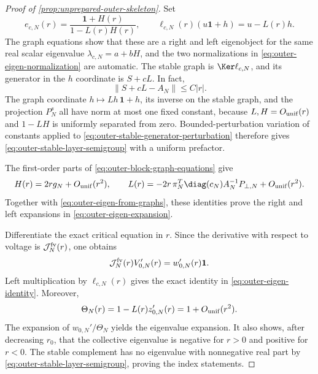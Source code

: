 \begin{proof}[Proof of \cref{prop:unprepared-outer-skeleton}]
Set
\begin{equation}
 e_{c,N}(r)=\frac{\mathbf1+H(r)}{1-L(r)H(r)},
 \qquad
 \ell_{c,N}(r)(u\mathbf1+h)=u-L(r)h.                \label{eq:outer-eigen-from-graphs}
\end{equation}
The graph equations show that these are a right and left eigenobject for the
same real scalar eigenvalue \(\lambda_{c,N}=a+bH\), and the two
normalizations in \cref{eq:outer-eigen-normalization} are automatic.  The
stable graph is \(\Ker\ell_{c,N}\), and its generator in the \(h\)
coordinate is \(S+cL\).  In fact,
\begin{equation}
 \|S+cL-A_N\|\le C|r|.                               \label{eq:outer-stable-generator-perturbation}
\end{equation}
The graph coordinate \(h\mapsto Lh\,\mathbf1+h\), its inverse on the stable
graph, and the projection \(P_N^s\) all have norm at most one fixed constant,
because \(L,H=O_{\rm unif}(r)\) and \(1-LH\) is uniformly separated from zero.
Bounded-perturbation variation of constants applied to
\cref{eq:outer-stable-generator-perturbation} therefore gives
\cref{eq:outer-stable-layer-semigroup} with a uniform prefactor.

The first-order parts of \cref{eq:outer-block-graph-equations} give
\begin{equation}
 H(r)=2r g_N+O_{\rm unif}(r^2),
 \qquad
 L(r)=-2r\,\pi_N^T\diag(c_N)A_N^{-1}P_{\perp,N}
          +O_{\rm unif}(r^2).                        \label{eq:outer-HL-expansion}
\end{equation}
Together with \cref{eq:outer-eigen-from-graphs}, these identities prove the
right and left expansions in \cref{eq:outer-eigen-expansion}.

Differentiate the exact critical equation in \(r\).  Since the derivative
with respect to voltage is \(\mathcal J^{\rm fv}_{N}(r)\), one obtains
\begin{equation}
 \mathcal J^{\rm fv}_{N}(r)V_{0,N}'(r)
 =w_{0,N}'(r)\mathbf1.                               \label{eq:outer-critical-differentiated}
\end{equation}
Left multiplication by \(\ell_{c,N}(r)\) gives the exact identity in
\cref{eq:outer-eigen-identity}.  Moreover,
\begin{equation*}
 \Theta_N(r)=1-L(r)z_{0,N}'(r)=1+O_{\rm unif}(r^2).
\end{equation*}
The expansion of \(w_{0,N}'/\Theta_N\) yields the eigenvalue expansion.
It also shows, after decreasing \(r_0\), that the collective eigenvalue is
negative for \(r>0\) and positive for \(r<0\).  The stable complement has
no eigenvalue with nonnegative real part by
\cref{eq:outer-stable-layer-semigroup}, proving the index statements.
\end{proof}

